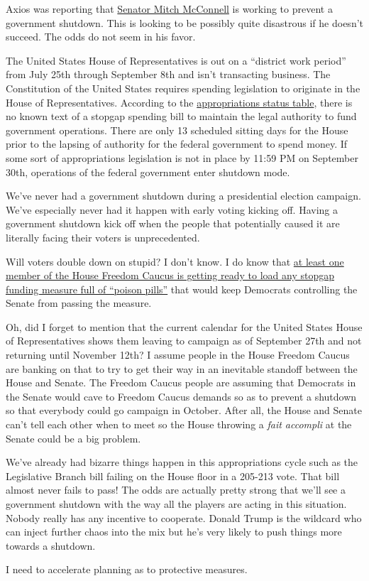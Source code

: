 Axios was reporting that
\href{https://www.axios.com/2024/08/25/mcconnell-republicans-save-act-immigrant-voting}{Senator
Mitch McConnell} is working to prevent a government shutdown. This is
looking to be possibly quite disastrous if he doesn't succeed. The odds
do not seem in his favor.

The United States House of Representatives is out on a ``district work
period'' from July 25th through September 8th and isn't transacting
business. The Constitution of the United States requires spending
legislation to originate in the House of Representatives. According to
the
\href{https://crsreports.congress.gov/AppropriationsStatusTable/}{appropriations
status table}, there is no known text of a stopgap spending bill to
maintain the legal authority to fund government operations. There are
only 13 scheduled sitting days for the House prior to the lapsing of
authority for the federal government to spend money. If some sort of
appropriations legislation is not in place by 11:59 PM on September
30th, operations of the federal government enter shutdown mode.

We've never had a government shutdown during a presidential election
campaign. We've especially never had it happen with early voting kicking
off. Having a government shutdown kick off when the people that
potentially caused it are literally facing their voters is
unprecedented.

Will voters double down on stupid? I don't know. I do know that
\href{https://cloud.house.gov/posts/heres-the-hard-truth-house-freedom-caucus-reveals-plan-to-prevent-non-citizen-voting-protect-second-trump-admin-from-lame-duck-omnibus}{at
least one member of the House Freedom Caucus is getting ready to load
any stopgap funding measure full of ``poison pills''} that would keep
Democrats controlling the Senate from passing the measure.

Oh, did I forget to mention that the current calendar for the United
States House of Representatives shows them leaving to campaign as of
September 27th and not returning until November 12th? I assume people in
the House Freedom Caucus are banking on that to try to get their way in
an inevitable standoff between the House and Senate. The Freedom Caucus
people are assuming that Democrats in the Senate would cave to Freedom
Caucus demands so as to prevent a shutdown so that everybody could go
campaign in October. After all, the House and Senate can't tell each
other when to meet so the House throwing a \emph{fait accompli} at the
Senate could be a big problem.

We've already had bizarre things happen in this appropriations cycle
such as the Legislative Branch bill failing on the House floor in a
205-213 vote. That bill almost never fails to pass! The odds are
actually pretty strong that we'll see a government shutdown with the way
all the players are acting in this situation. Nobody really has any
incentive to cooperate. Donald Trump is the wildcard who can inject
further chaos into the mix but he's very likely to push things more
towards a shutdown.

I need to accelerate planning as to protective measures.

